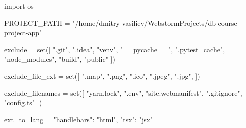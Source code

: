 \begin{pycode}
import os

PROJECT_PATH = "/home/dmitry-vasiliev/WebstormProjects/db-course-project-app"

exclude = set([
    ".git",
    ".idea",
    "venv",
    "__pycache__",
    ".pytest_cache",
    "node_modules",
    "build",
    "public"
])

exclude_file_ext = set([
    ".map",
    ".png",
    ".ico",
    ".jpeg",
    ".jpg",
])

exclude_filenames = set([
    "yarn.lock",
    ".env",
    "site.webmanifest",
    ".gitignore",
    "config.ts"
])

ext_to_lang = {
    "handlebars": "html",
    "tsx": "jsx"
}
\end{pycode}